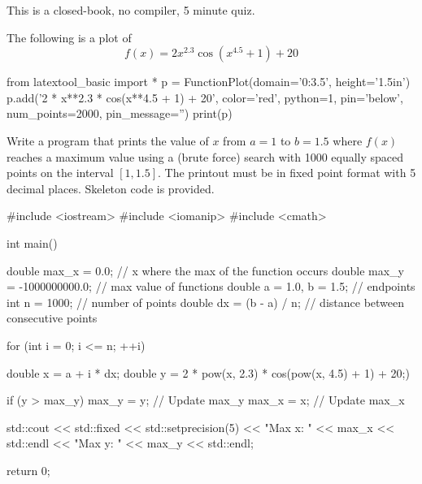 

This is a closed-book, no compiler, 5 minute quiz.

\nextq
The following is a plot of
\[
f(x) = 2 x^{2.3} \cos{(x^{4.5} + 1)} + 20
\]
\begin{python}
from latextool_basic import *
p = FunctionPlot(domain='0:3.5', height='1.5in')
p.add('2 * x**2.3 * cos(x**4.5 + 1) + 20', color='red', python=1, pin='below', num_points=2000,
pin_message='')
print(p)
\end{python}
Write a program that prints the value of $x$ from $a=1$ to $b=1.5$ where
$f(x)$ reaches a maximum value using a  (brute force) search with
1000 equally spaced points on the interval $[1, 1.5]$.
The printout must be in fixed point format with 5 decimal places.
Skeleton code is provided.
\\
\ANSWER
\begin{answercode}
#include <iostream>
#include <iomanip>
#include <cmath>

int main()
{
    double max_x = 0.0;               // x where the max of the function occurs
    double max_y = -1000000000.0;     // max value of functions
    double a = 1.0, b = 1.5;          // endpoints
    int n = 1000;                     // number of points
    double dx = (b - a) / n;          // distance between consecutive points

    for (int i = 0; i <= n; ++i)      
    {
        double x = a + i * dx;        
        double y = 2 * pow(x, 2.3) * cos(pow(x, 4.5) + 1) + 20;)

        if (y > max_y)
        {
            max_y = y;                // Update max_y
            max_x = x;                // Update max_x
        }
    }
    std::cout << std::fixed << std::setprecision(5)
              << "Max x: " << max_x << std::endl
              << "Max y: " << max_y << std::endl;

    return 0;
}
\end{answercode}

